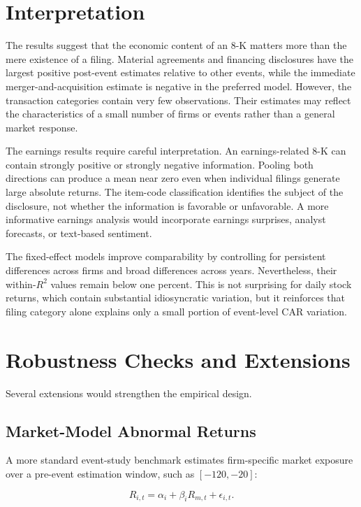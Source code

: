 \documentclass[12pt]{article}
\begin{document}
\section{Interpretation}

The results suggest that the economic content of an 8-K matters more than the mere existence of a filing. Material agreements and financing disclosures have the largest positive post-event estimates relative to other events, while the immediate merger-and-acquisition estimate is negative in the preferred model. However, the transaction categories contain very few observations. Their estimates may reflect the characteristics of a small number of firms or events rather than a general market response.

The earnings results require careful interpretation. An earnings-related 8-K can contain strongly positive or strongly negative information. Pooling both directions can produce a mean near zero even when individual filings generate large absolute returns. The item-code classification identifies the subject of the disclosure, not whether the information is favorable or unfavorable. A more informative earnings analysis would incorporate earnings surprises, analyst forecasts, or text-based sentiment.

The fixed-effect models improve comparability by controlling for persistent differences across firms and broad differences across years. Nevertheless, their within-$R^2$ values remain below one percent. This is not surprising for daily stock returns, which contain substantial idiosyncratic variation, but it reinforces that filing category alone explains only a small portion of event-level CAR variation.

\section{Robustness Checks and Extensions}

Several extensions would strengthen the empirical design.

\subsection{Market-Model Abnormal Returns}

A more standard event-study benchmark estimates firm-specific market exposure over a pre-event estimation window, such as $[-120,-20]$:

\begin{equation}
R_{i,t}=\alpha_i+\beta_i R_{m,t}+\epsilon_{i,t}.
\end{equation}
\end{document}
